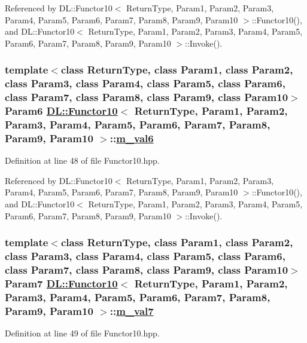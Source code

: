 Referenced by DL::Functor10$<$ Return\-Type, Param1, Param2, Param3, Param4, Param5, Param6, Param7, Param8, Param9, Param10 $>$::Functor10(), and DL::Functor10$<$ Return\-Type, Param1, Param2, Param3, Param4, Param5, Param6, Param7, Param8, Param9, Param10 $>$::Invoke().\hypertarget{classDL_1_1Functor10_r6}{
\subsubsection[m\_\-val6]{\setlength{\rightskip}{0pt plus 5cm}template$<$class Return\-Type, class Param1, class Param2, class Param3, class Param4, class Param5, class Param6, class Param7, class Param8, class Param9, class Param10$>$ Param6 \hyperlink{classDL_1_1Functor10}{DL::Functor10}$<$ Return\-Type, Param1, Param2, Param3, Param4, Param5, Param6, Param7, Param8, Param9, Param10 $>$::\hyperlink{classDL_1_1Functor10_r6}{m\_\-val6}}}
\label{classDL_1_1Functor10_r6}




Definition at line 48 of file Functor10.hpp.

Referenced by DL::Functor10$<$ Return\-Type, Param1, Param2, Param3, Param4, Param5, Param6, Param7, Param8, Param9, Param10 $>$::Functor10(), and DL::Functor10$<$ Return\-Type, Param1, Param2, Param3, Param4, Param5, Param6, Param7, Param8, Param9, Param10 $>$::Invoke().\hypertarget{classDL_1_1Functor10_r7}{
\subsubsection[m\_\-val7]{\setlength{\rightskip}{0pt plus 5cm}template$<$class Return\-Type, class Param1, class Param2, class Param3, class Param4, class Param5, class Param6, class Param7, class Param8, class Param9, class Param10$>$ Param7 \hyperlink{classDL_1_1Functor10}{DL::Functor10}$<$ Return\-Type, Param1, Param2, Param3, Param4, Param5, Param6, Param7, Param8, Param9, Param10 $>$::\hyperlink{classDL_1_1Functor10_r7}{m\_\-val7}}}
\label{classDL_1_1Functor10_r7}




Definition at line 49 of file Functor10.hpp.

